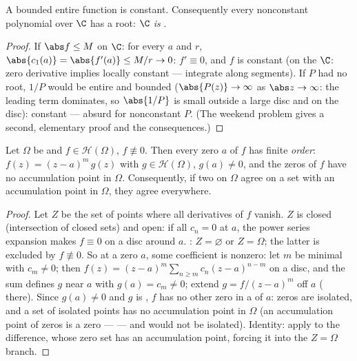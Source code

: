 \begin{corollary}
\label{cor:b3:holomorphic:liouville}
A bounded entire function is constant. Consequently every
nonconstant polynomial over $\C$ has a root: \emph{$\C$ is
}.
\end{corollary}

\begin{proof}
If $\abs f \leq M$ on $\C$: for every $a$ and $r$, $\abs{c_1(a)}
= \abs{f'(a)} \leq M/r \to 0$: $f' \equiv 0$, and $f$ is
constant (on the  $\C$: zero derivative implies
locally constant --- integrate along segments). If $P$ had no
root, $1/P$ would be entire and bounded ($\abs{P(z)} \to
\infty$ as $\abs z \to \infty$: the leading term dominates, so
$\abs{1/P}$ is small outside a large disc and  on
the  disc): constant --- absurd for nonconstant $P$.
(The weekend problem gives a second, elementary proof and the
 consequences.)
\end{proof}

\begin{theorem}
\label{thm:b3:holomorphic:identity}
Let $\Omega$ be \emph{} and $f \in \mathcal
H(\Omega)$, $f \not\equiv 0$. Then every zero $a$ of $f$ has
finite \emph{order}: $f(z) = (z - a)^m\,g(z)$ with $g \in
\mathcal H(\Omega)$, $g(a) \neq 0$, and the zeros of $f$ have
no accumulation point in $\Omega$. Consequently, if two
 on $\Omega$ agree on a set with an
accumulation point in $\Omega$, they agree
everywhere.
\end{theorem}

\begin{proof}
Let $Z$ be the set of points where all derivatives of $f$
vanish. $Z$ is closed (intersection of closed sets) and open:
if all $c_n = 0$ at $a$, the power series expansion makes $f
\equiv 0$ on a disc around $a$. : $Z =
\varnothing$ or $Z = \Omega$; the latter is excluded by $f
\not\equiv 0$. So at a zero $a$, some coefficient is nonzero:
let $m$ be minimal with $c_m \neq 0$; then $f(z) = (z -
a)^m\sum_{n\geq m}c_n(z-a)^{n-m}$ on a disc, and the sum
defines $g$  near $a$ with $g(a) = c_m \neq 0$;
extend $g = f/(z-a)^m$ off $a$ ( there). Since
$g(a) \neq 0$ and $g$ is , $f$ has no other zero in
a  of $a$: zeros are isolated, and a set of
isolated points has no accumulation point in $\Omega$ (an
accumulation point of zeros is a zero ---  --- and
would not be isolated). Identity: apply to the difference,
whose zero set has an accumulation point, forcing it into the
$Z = \Omega$ branch.
\end{proof}

